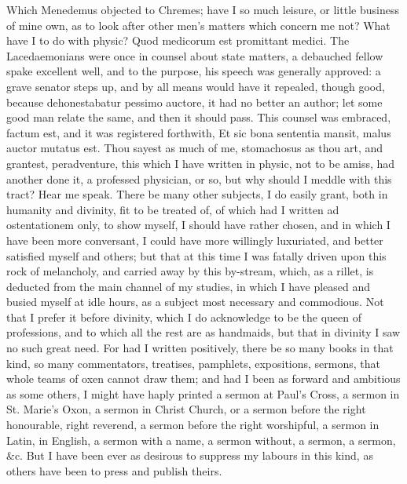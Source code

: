 {Which Menedemus objected to Chremes; have I so much leisure, or little
business of mine own, as to look after other men's matters which
concern me not? What have I to do with physic? Quod medicorum est
promittant medici. The Lacedaemonians were once in counsel about
state matters, a debauched fellow spake excellent well, and to the
purpose, his speech was generally approved: a grave senator steps up,
and by all means would have it repealed, though good, because
dehonestabatur pessimo auctore, it had no better an author; let some
good man relate the same, and then it should pass. This counsel was
embraced, factum est, and it was registered forthwith, Et sic bona
sententia mansit, malus auctor mutatus est. Thou sayest as much of me,
stomachosus as thou art, and grantest, peradventure, this which I have
written in physic, not to be amiss, had another done it, a professed
physician, or so, but why should I meddle with this tract? Hear me
speak. There be many other subjects, I do easily grant, both in
humanity and divinity, fit to be treated of, of which had I written ad
ostentationem only, to show myself, I should have rather chosen, and in
which I have been more conversant, I could have more willingly
luxuriated, and better satisfied myself and others; but that at this
time I was fatally driven upon this rock of melancholy, and carried
away by this by-stream, which, as a rillet, is deducted from the main
channel of my studies, in which I have pleased and busied myself at
idle hours, as a subject most necessary and commodious. Not that I
prefer it before divinity, which I do acknowledge to be the queen of
professions, and to which all the rest are as handmaids, but that in
divinity I saw no such great need. For had I written positively, there
be so many books in that kind, so many commentators, treatises,
pamphlets, expositions, sermons, that whole teams of oxen cannot draw
them; and had I been as forward and ambitious as some others, I might
have haply printed a sermon at Paul's Cross, a sermon in St. Marie's
Oxon, a sermon in Christ Church, or a sermon before the right
honourable, right reverend, a sermon before the right worshipful, a
sermon in Latin, in English, a sermon with a name, a sermon without, a
sermon, a sermon, \&c. But I have been ever as desirous to suppress my
labours in this kind, as others have been to press and publish theirs.

}

